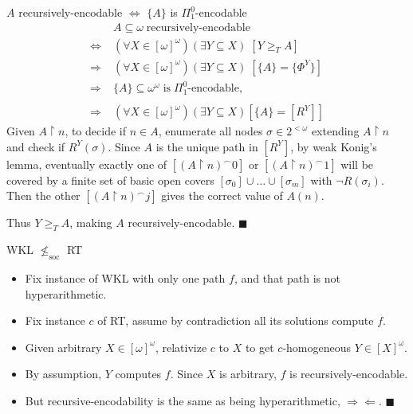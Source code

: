 \begin{frame}{$A$ recursively-encodable $\Leftrightarrow$
$\{A\}$ is $\Pi_1^0$-encodable}
  \begin{align*}
    \;&A\subseteq\omega\; \text{recursively-encodable}\\
    \Leftrightarrow\; & (\forall X\in[\omega]^\omega)(\exists Y\subseteq
      X)\; [Y\geq_T A]\\
    \Rightarrow\; & (\forall X\in[\omega]^\omega)(\exists Y\subseteq X)\;
      [\{A\}=\{\Phi^Y\}]\\
    \Rightarrow\; &\{A\}\subseteq\omega^\omega\; \text{is}\;
      \Pi_1^0\text{-encodable},\\
    &\\
    \Rightarrow\; & (\forall X\in[\omega]^\omega)(\exists Y\subseteq
      X) [\{A\}=[R^Y]]
  \end{align*}
  Given $A\restriction n$, to decide if $n\in A$, enumerate all nodes
  $\sigma\in2^{<\omega}$ extending $A\restriction n$ and check if
  $R^Y(\sigma)$. Since $A$ is the unique path in $[R^Y]$, by weak Konig's
  lemma, eventually exactly one of $[(A\restriction n)^\frown 0]$ or
  $[(A\restriction n)^\frown 1]$ will be covered by a finite set of basic
  open covers $[\sigma_0]\cup\ldots\cup[\sigma_m]$ with $\neg R(\sigma_i)$.
  Then the other $[(A\restriction n)^\frown j]$ gives the correct value
  of $A(n)$.
  \vspace{0.5em}

  Thus $Y\geq_TA$, making $A$ recursively-encodable. $\blacksquare$
\end{frame}

\begin{frame}{WKL $\nleq_{\text{soc}}$ RT}
  \begin{itemize}
    \item Fix instance of WKL with only one path $f$, and that path is
      not hyperarithmetic.
    \item Fix instance $c$ of RT, assume by contradiction all
      its solutions compute $f$.
    \item Given arbitrary $X\in[\omega]^\omega$, relativize $c$ to
      $X$ to get $c$-homogeneous $Y\in[X]^\omega$.
    \item By assumption, $Y$ computes $f$. Since $X$ is arbitrary, $f$ is
      recursively-encodable.
    \item But recursive-encodability is the same as being
      hyperarithmetic, $\Rightarrow\Leftarrow$. $\blacksquare$
  \end{itemize}
\end{frame}
